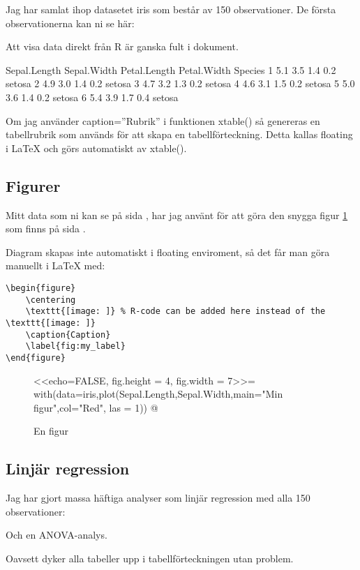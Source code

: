 \documentclass[10pt,swedish, openany]{book}
\begin{document}
Jag har samlat ihop datasetet iris som består av 150 observationer. De första observationerna kan ni se här: \label{min_data}

Att visa data direkt från R är ganska fult i dokument.

\begin{Schunk}
\begin{Soutput}
  Sepal.Length Sepal.Width Petal.Length Petal.Width Species
1          5.1         3.5          1.4         0.2  setosa
2          4.9         3.0          1.4         0.2  setosa
3          4.7         3.2          1.3         0.2  setosa
4          4.6         3.1          1.5         0.2  setosa
5          5.0         3.6          1.4         0.2  setosa
6          5.4         3.9          1.7         0.4  setosa
\end{Soutput}
\end{Schunk}



Om jag använder caption=”Rubrik” i funktionen xtable() så genereras en tabellrubrik som används för att skapa en tabellförteckning. Detta kallas floating i LaTeX och görs automatiskt av xtable().

\subsection*{Figurer}
Mitt data som ni kan se på sida \pageref{min_data}, har jag använt för att göra den snygga figur \ref{fig:En-figur} som finns på sida \pageref{fig:En-figur}. 

Diagram skapas inte automatiskt i floating enviroment, så det får man göra manuellt i LaTeX med: \begin{verbatim}
\begin{figure}
    \centering
    \texttt{[image: ]} % R-code can be added here instead of the \texttt{[image: ]}
    \caption{Caption}
    \label{fig:my_label}
\end{figure}
\end{verbatim}

\begin{figure}[H]
    \centering
    <<echo=FALSE, fig.height = 4, fig.width = 7>>=
    with(data=iris,plot(Sepal.Length,Sepal.Width,main="Min figur",col="Red", las = 1))
    @
    \caption{En figur}
    \label{fig:En-figur}
\end{figure}

\subsection*{Linjär regression}
Jag har gjort massa häftiga analyser som linjär regression med alla 150 observationer:



Och en ANOVA-analys. 



Oavsett dyker alla tabeller upp i tabellförteckningen utan problem.

\pagebreak




\end{document}

